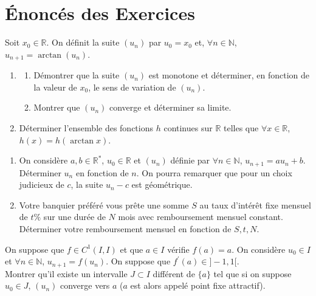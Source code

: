 

\section{Énoncés des Exercices}

\begin{exercice}
Soit $x_{0}\in\mathbb{R}$. On définit la suite $(u_{n})$ par $u_{0}=x_{0}$ et, $\forall n\in\mathbb{N}$, $u_{n+1}=\arctan(u_{n}).$
\begin{enumerate}
    \item 
    \begin{enumerate}
        \item Démontrer que la suite $(u_{n})$ est monotone et déterminer, en fonction de la valeur de $x_{0}$, le sens de variation de $(u_{n})$.
        \item Montrer que $(u_{n})$ converge et déterminer sa limite.
    \end{enumerate}
    \item Déterminer l'ensemble des fonctions $h$ continues sur $\mathbb{R}$ telles que $\forall x\in\mathbb{R}$, $h(x)=h(\arctan x)$.
\end{enumerate}
\end{exercice}

\begin{exercice}
\begin{enumerate}
    \item On considère $a, b\in\mathbb{R}^{*}$, $u_{0}\in\mathbb{R}$ et $(u_{n})$ définie par $\forall n\in\mathbb{N}$, $u_{n+1}=au_{n}+b$.
    Déterminer $u_{n}$ en fonction de $n$. On pourra remarquer que pour un choix judicieux de $c$, la suite $u_{n}-c$ est géométrique.

    \item 
    Votre banquier préféré vous prête une somme $S$ au taux d'intérêt fixe mensuel de $t\%$ sur une durée de $N$ mois avec remboursement mensuel constant.
    Déterminer votre remboursement mensuel en fonction de $S, t, N$.
\end{enumerate}

\end{exercice}

\begin{exercice}
On suppose que $f\in C^{1}(I,I)$ et que $a\in I$ vérifie $f(a)=a$.
On considère $u_{0}\in I$ et $\forall n\in\mathbb{N}$, $u_{n+1}=f(u_{n})$.
On suppose que $f^{\prime}(a)\in]-1,1[$. \\

Montrer qu'il existe un intervalle $J\subset I$ différent de $\{a\}$ tel que si on suppose $u_{0}\in J$, $(u_n)$ converge vers $a$ ($a$ est alors appelé point fixe attractif).
\end{exercice}

